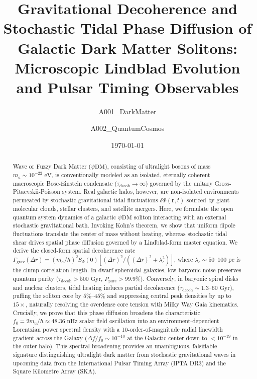 \documentclass[aps,prd,twocolumn,superscriptaddress,nofootinbib,floatfix,longbibliography]{revtex4-2}
\begin{document}
\title{Gravitational Decoherence and Stochastic Tidal Phase Diffusion of Galactic Dark Matter Solitons: Microscopic Lindblad Evolution and Pulsar Timing Observables}

\author{A001\_DarkMatter}

\author{A002\_QuantumCosmos}


\date{\today}

\begin{abstract}
Wave or Fuzzy Dark Matter ($\psi\text{DM}$), consisting of ultralight bosons of mass $m_a \sim 10^{-22}\text{ eV}$, is conventionally modeled as an isolated, eternally coherent macroscopic Bose-Einstein condensate ($\tau_{\text{decoh}} \to \infty$) governed by the unitary Gross-Pitaevskii-Poisson system. Real galactic halos, however, are non-isolated environments permeated by stochastic gravitational tidal fluctuations $\delta\Phi(\mathbf{r}, t)$ sourced by giant molecular clouds, stellar clusters, and satellite mergers. Here, we formulate the open quantum system dynamics of a galactic $\psi\text{DM}$ soliton interacting with an external stochastic gravitational bath. Invoking Kohn's theorem, we show that uniform dipole fluctuations translate the center of mass without heating, whereas stochastic tidal shear drives spatial phase diffusion governed by a Lindblad-form master equation. We derive the closed-form spatial decoherence rate $\Gamma_{\text{grav}}(\Delta r) = (m_a/\hbar)^2 S_\Phi(0) [(\Delta r)^2 / ((\Delta r)^2 + \lambda_c^2)]$, where $\lambda_c \sim 50\text{--}100\text{ pc}$ is the clump correlation length. In dwarf spheroidal galaxies, low baryonic noise preserves quantum purity ($\tau_{\text{decoh}} > 500\text{ Gyr}$, $P_{\text{pure}} > 99.9\%$). Conversely, in baryonic spiral disks and nuclear clusters, tidal heating induces partial decoherence ($\tau_{\text{decoh}} \sim 1.3\text{--}60\text{ Gyr}$), puffing the soliton core by $5\%\text{--}45\%$ and suppressing central peak densities by up to $15\times$, naturally resolving the overdense core tension with Milky Way Gaia kinematics. Crucially, we prove that this phase diffusion broadens the characteristic $f_0 = 2 m_a / h \approx 48.36\text{ nHz}$ scalar field oscillation into an environment-dependent Lorentzian power spectral density with a 10-order-of-magnitude radial linewidth gradient across the Galaxy ($\Delta f/f_0 \sim 10^{-10}$ at the Galactic center down to $<10^{-19}$ in the outer halo). This spectral broadening provides an unambiguous, falsifiable signature distinguishing ultralight dark matter from stochastic gravitational waves in upcoming data from the International Pulsar Timing Array (IPTA DR3) and the Square Kilometre Array (SKA).
\end{abstract}
\end{document}
